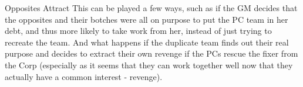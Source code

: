 \begin{scenario}{Opposites Attract}
\twist This can be played a few ways, such as if the GM decides that the opposites and their botches were all on purpose to put the PC team in her debt, and thus more likely to take work from her, instead of just trying to recreate the team. And what happens if the duplicate team finds out their real purpose and decides to extract their own revenge if the PCs rescue the fixer from the Corp (especially as it seems that they can work together well now that they actually have a common interest - revenge). 

\end{scenario}